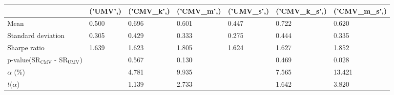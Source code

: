 \begin{tabular}{lllllll}
\toprule
 & ('UMV',) & ('CMV_k',) & ('CMV_m',) & ('UMV_s',) & ('CMV_k_s',) & ('CMV_m_s',) \\
\midrule
Mean & 0.500 & 0.696 & 0.601 & 0.447 & 0.722 & 0.620 \\
Standard deviation & 0.305 & 0.429 & 0.333 & 0.275 & 0.444 & 0.335 \\
Sharpe ratio & 1.639 & 1.623 & 1.805 & 1.624 & 1.627 & 1.852 \\
p-value(SR$_{\text{CMV}}$ - SR$_{\text{UMV}}$) &  & 0.567 & 0.130 &  & 0.469 & 0.028 \\
$\alpha$ (\%) &  & 4.781 & 9.935 &  & 7.565 & 13.421 \\
$t$($\alpha$) &  & 1.139 & 2.733 &  & 1.642 & 3.820 \\
\bottomrule
\end{tabular}
